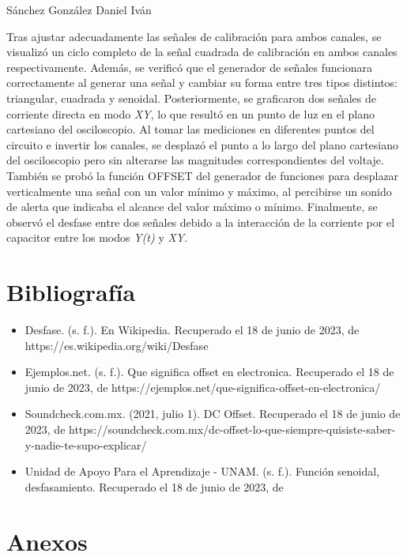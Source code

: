 \documentclass[a4paper,12pt]{article}
\begin{document}
\vspace{1cm}

{\Large Sánchez González Daniel Iván}\\
\vspace{.3cm}

Tras ajustar adecuadamente las señales de calibración para ambos canales, se visualizó un ciclo completo de la señal cuadrada de calibración en ambos canales respectivamente. Además, se verificó que el generador de señales funcionara correctamente al generar una señal y cambiar su forma entre tres tipos distintos: triangular, cuadrada y senoidal. Posteriormente, se graficaron dos señales de corriente directa en modo \emph{XY}, lo que resultó en un punto de luz en el plano cartesiano del osciloscopio. Al tomar las mediciones en diferentes puntos del circuito e invertir los canales, se desplazó el punto a lo largo del plano cartesiano del osciloscopio pero sin alterarse las magnitudes correspondientes del voltaje. También se probó la función OFFSET del generador de funciones para desplazar verticalmente una señal con un valor mínimo y máximo, al percibirse un sonido de alerta que indicaba el alcance del valor máximo o mínimo. Finalmente, se observó el desfase entre dos señales debido a la interacción de la corriente por el capacitor entre los modos \emph{Y(t)} y \emph{XY}.


\section{Bibliografía}

\begin{itemize}
\item Desfase. (s. f.). En Wikipedia. Recuperado el 18 de junio de 2023, de https://es.wikipedia.org/wiki/Desfase
\item Ejemplos.net. (s. f.). Que significa offset en electronica. Recuperado el 18 de junio de 2023, de https://ejemplos.net/que-significa-offset-en-electronica/
\item Soundcheck.com.mx. (2021, julio 1). DC Offset. Recuperado el 18 de junio de 2023, de https://soundcheck.com.mx/dc-offset-lo-que-siempre-quisiste-saber-y-nadie-te-supo-explicar/
\item Unidad de Apoyo Para el Aprendizaje - UNAM. (s. f.). Función senoidal, desfasamiento. Recuperado el 18 de junio de 2023, de
\end{itemize}

\newpage
\section{Anexos}
\end{document}
